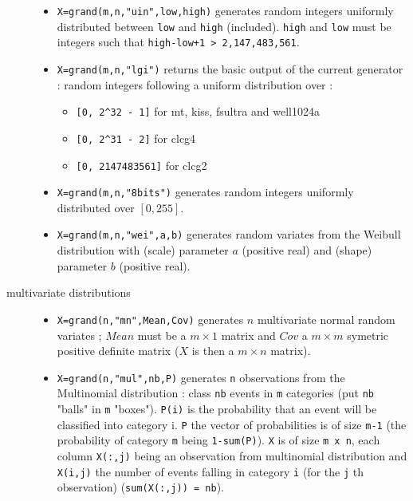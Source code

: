 \begin{description}
\begin{itemize}
\item {} \verb!X=grand(m,n,"uin",low,high)! generates random integers uniformly 
      distributed between \verb!low! and \verb!high! (included). \verb!high!
      and \verb!low! must be integers such that \verb!high-low+1 > 2,147,483,561!.

\item {} \verb!X=grand(m,n,"lgi")! returns the basic output of the current generator : random integers  
      following a uniform distribution over : 
      \begin{itemize}
      \item \verb![0, 2^32 - 1]! for mt, kiss, fsultra and well1024a
      \item \verb![0, 2^31 - 2]! for clcg4
      \item \verb![0, 2147483561]! for clcg2
      \end{itemize}

\item {} \verb!X=grand(m,n,"8bits")! generates random integers uniformly 
      distributed over $[0,255]$.
  
\item {} 
  \verb!X=grand(m,n,"wei",a,b)! generates random variates from the Weibull 
  distribution with (scale) parameter $a$ (positive real) and (shape) parameter $b$ (positive real).
\end{itemize}

\item[multivariate distributions]
\begin{itemize}
\item {}
  \verb!X=grand(n,"mn",Mean,Cov)! generates  $n$ multivariate normal random variates ; 
  $Mean$ must be a $m \times 1$ matrix and $Cov$ a  $m \times m$ 
  symetric positive definite matrix  ($X$ is then a  $m \times n$
  matrix).

\item {} 
   \verb!X=grand(n,"mul",nb,P)! generates \verb!n! observations from the Multinomial 
  distribution :  class \verb!nb! events in \verb!m! categories (put \verb!nb!
  "balls" in \verb!m! "boxes"). \verb!P(i)! is the probability 
  that an event will be classified into category i. \verb!P! the vector of probabilities
  is of size  \verb!m-1! (the probability of category \verb!m! being \verb!1-sum(P)!).
  \verb!X! is of size \verb!m x n!, each column \verb!X(:,j)! being an observation 
  from multinomial distribution and \verb!X(i,j)! the number of events falling in category 
  \verb!i! (for the \verb!j! th observation) (\verb!sum(X(:,j)) = nb!).
  

\end{itemize}
\end{description}
